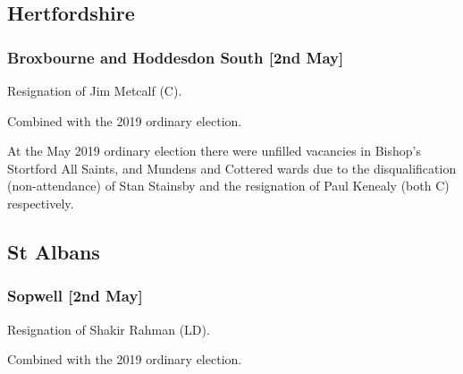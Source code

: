 \begin{resultsiii}
	\section{Hertfordshire}


	\subsubsection*{Broxbourne and Hoddesdon South \hspace*{\fill}\nolinebreak[1]%
		\enspace\hspace*{\fill}
		[2nd May]}


	Resignation of Jim Metcalf (C).

	Combined with the 2019 ordinary election.


	At the May 2019 ordinary election there were unfilled vacancies in Bishop's Stortford All Saints, and Mundens and Cottered wards due to the disqualification (non-attendance) of Stan Stainsby and the resignation of Paul Kenealy (both C) respectively.

\subsection*{St Albans}

	\subsubsection*{Sopwell \hspace*{\fill}\nolinebreak[1]%
		\enspace\hspace*{\fill}
		[2nd May]}


	Resignation of Shakir Rahman (LD).

	Combined with the 2019 ordinary election.


\end{resultsiii}
